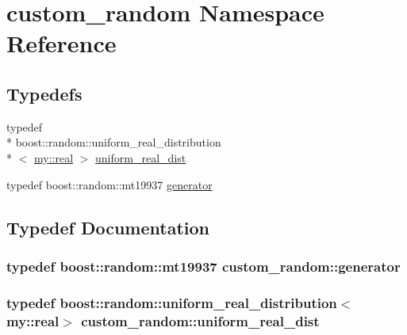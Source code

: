 \hypertarget{namespacecustom__random}{\section{custom\+\_\+random Namespace Reference}
\label{namespacecustom__random}
}
\subsection*{Typedefs}
\begin{DoxyCompactItemize}
\item 
typedef \\*
boost\+::random\+::uniform\+\_\+real\+\_\+distribution\\*
$<$ \hyperlink{namespacemy_ad61baeaeda728a4c48dd64f93e44a46c}{my\+::real} $>$ \hyperlink{namespacecustom__random_aabaaf85a6342ff33004ff1ba5eaf9014}{uniform\+\_\+real\+\_\+dist}
\item 
typedef boost\+::random\+::mt19937 \hyperlink{namespacecustom__random_a46f0cd4be260de20f93531f3f9c1a2f6}{generator}
\end{DoxyCompactItemize}


\subsection{Typedef Documentation}
\hypertarget{namespacecustom__random_a46f0cd4be260de20f93531f3f9c1a2f6}{
\subsubsection[{generator}]{\setlength{\rightskip}{0pt plus 5cm}typedef boost\+::random\+::mt19937 {\bf custom\+\_\+random\+::generator}}}\label{namespacecustom__random_a46f0cd4be260de20f93531f3f9c1a2f6}
\hypertarget{namespacecustom__random_aabaaf85a6342ff33004ff1ba5eaf9014}{
\subsubsection[{uniform\+\_\+real\+\_\+dist}]{\setlength{\rightskip}{0pt plus 5cm}typedef boost\+::random\+::uniform\+\_\+real\+\_\+distribution$<${\bf my\+::real}$>$ {\bf custom\+\_\+random\+::uniform\+\_\+real\+\_\+dist}}}\label{namespacecustom__random_aabaaf85a6342ff33004ff1ba5eaf9014}
